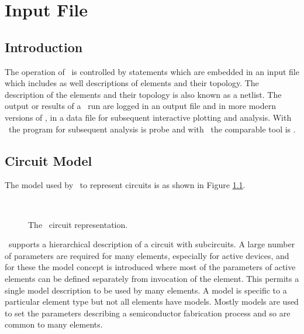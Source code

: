 
\chapter{Input File\label{chapter:input}}

\section{Introduction}

The operation of \spice\ is controlled by statements which are embedded
in an input file which includes as well descriptions of elements and
their topology.
The description of the elements and their topology is also known as a
netlist.
The output or results of a \spice\ run are logged in an output file
and in more modern versions of \spice , in a data file for
subsequent interactive plotting and analysis.  With \pspice\ the program
for subsequent analysis is probe and with \spicethree\ the comparable tool
is \nutmeg .

\section{Circuit Model}

The model used by \spice\  to represent circuits is as shown
in Figure \ref{spice:circuit}.
\begin{figure}
\begin{center}
\ \epsfxsize=5.5in
\end{center}
\caption{The \spice\ circuit representation.\label{spice:circuit}}
\end{figure}
\spice\ supports a hierarchical description of a circuit with subcircuits.
A large number of parameters are required for many
elements, especially for active devices, and for these the model
concept
is introduced where most of the parameters of active elements can be defined
separately from invocation of the element.  This permits a single model
description to be used by many elements.
A model is specific to a particular element type but not all elements have
models.
Mostly models are used to set the parameters describing a semiconductor
fabrication process and so are common to many elements.



